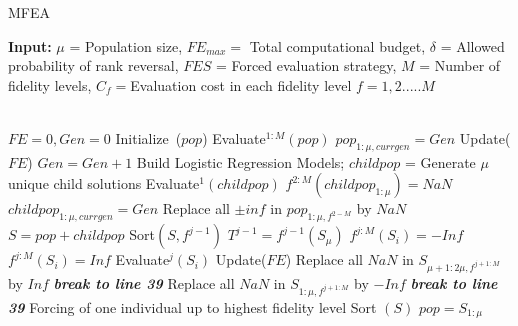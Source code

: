\begin{algorithm}[!htb]\scriptsize
	\caption{MFEA\label{alg:MFEA}}
	\textbf{Input:} $\mu$ = Population size, $FE_{max}=$ Total computational budget, $\delta$ = Allowed probability of rank reversal, $FES$ = Forced evaluation strategy, $M$ = Number of fidelity levels, $C_f = $Evaluation cost in each fidelity level $f=1,2.....M $\\\\
	\begin{algorithmic}[1]
		\STATE $FE=0, Gen=0$
		\STATE Initialize~($pop$) 
		\STATE Evaluate$^{1:M}(pop)$ 
		\STATE $pop_{1:\mu,currgen}=Gen$    
		\STATE Update($FE$)   
		\STATE $Gen=Gen+1$
		\STATE Build Logistic Regression Models; 
		\STATE $childpop$ = Generate $\mu$ unique child solutions 
		\STATE Evaluate$^1(childpop)$ 
		\STATE $f^{2:M}(childpop_{1:\mu})=NaN$ 
		\STATE $childpop_{1:\mu,currgen}=Gen$
		\STATE Replace all $\pm inf$ in $pop_{1:\mu,f^{2-M}}$ by $NaN$ 
		\STATE $S=pop+childpop$
		\STATE Sort$(S,f^{j-1})$ 
		\STATE $T^{j-1} = f^{j-1}(S_{\mu})$  
		\STATE $f^{j:M}(S_i)=-Inf$  
		\ELSE
		\STATE $f^{j:M}(S_{i})=Inf$ 
		\ENDIF  %
		\ELSE
		\STATE Evaluate$^j(S_{i})$ 
		\ENDIF %
		\ENDIF %
		\STATE Update($FE$) 
		\STATE Replace all $NaN$ in $S_{\mu+1:2\mu,f^{j+1:M}}$ by $Inf$
		\STATE \textit{\textbf{break to line 39}}
		\STATE Replace all $NaN$ in $S_{1:\mu,f^{j+1:M}}$ by $-Inf$
		\STATE \textit{\textbf{break to line 39}}
		\ENDIF
		\ENDFOR
		\ENDFOR
		\STATE Forcing of one individual up to highest fidelity level
		\STATE Sort $(S)$
		\STATE $pop=S_{1:\mu}$
		\ENDWHILE
	\end{algorithmic}
	\label{alg:MFEA}
\end{algorithm}


